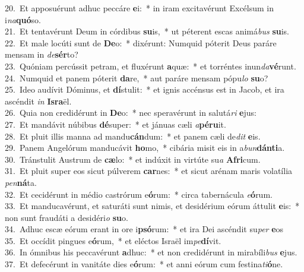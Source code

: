 {20.~}Et apposuérunt adhuc peccáre \textbf{e}i:~* in iram excitavérunt Excélsum in i\textit{na}\textbf{quó}so.\\
{21.~}Et tentavérunt Deum in córdibus \textbf{su}is,~* ut péterent escas animá\textit{bus} \textbf{su}is.\\
{22.~}Et male locúti sunt de \textbf{De}o:~* dixérunt: Numquid póterit Deus paráre mensam in \textit{de}\textbf{sér}to?\\
{23.~}Quóniam percússit petram, et fluxérunt \textbf{a}quæ:~* et torréntes inun\textit{da}\textbf{vé}runt.\\
{24.~}Numquid et panem póterit \textbf{da}re,~* aut paráre mensam pópu\textit{lo} \textbf{su}o?\\
{25.~}Ideo audívit Dóminus, et \textbf{dí}stulit:~* et ignis accénsus est in Jacob, et ira ascéndit \textit{in} \textbf{Is}\textbf{ra}ël.\\
{26.~}Quia non credidérunt in \textbf{De}o:~* nec speravérunt in salutá\textit{ri} \textbf{e}jus:\\
{27.~}Et mandávit núbibus \textbf{dé}super:~* et jánuas cæli \textit{a}\textbf{pé}\textbf{ru}it.\\
{28.~}Et pluit illis manna ad mandu\textbf{cán}dum:~* et panem cæli de\textit{dit} \textbf{e}is.\\
{29.~}Panem Angelórum manducávit \textbf{ho}mo,~* cibária misit eis in a\textit{bun}\textbf{dán}\textbf{ti}a.\\
{30.~}Tránstulit Austrum de \textbf{cæ}lo:~* et indúxit in virtúte su\textit{a} \textbf{A}\textbf{fri}cum.\\
{31.~}Et pluit super eos sicut púlverem \textbf{car}nes:~* et sicut arénam maris volatília \textit{pen}\textbf{ná}ta.\\
{32.~}Et cecidérunt in médio castrórum e\textbf{ó}rum:~* circa tabernácula \textit{e}\textbf{ó}rum.\\
{33.~}Et manducavérunt, et saturáti sunt nimis, et desidérium eórum áttulit \textbf{e}is:~* non sunt fraudáti a desidéri\textit{o} \textbf{su}o.\\
{34.~}Adhuc escæ eórum erant in ore i\textbf{psó}rum:~* et ira Dei ascéndit su\textit{per} \textbf{e}os\\
{35.~}Et occídit pingues e\textbf{ó}rum,~* et eléctos Israël im\textit{pe}\textbf{dí}vit.\\
{36.~}In ómnibus his peccavérunt \textbf{a}dhuc:~* et non credidérunt in mirabíli\textit{bus} \textbf{e}jus.\\
{37.~}Et defecérunt in vanitáte dies e\textbf{ó}rum:~* et anni eórum cum festina\textit{ti}\textbf{ó}ne.\\

